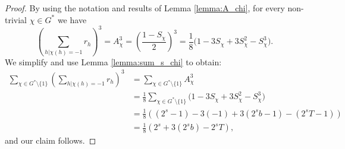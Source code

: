 \documentclass[12pt,twoside,]{amsart}
\theoremstyle{plain}
\theoremstyle{definition}
\begin{document}
\begin{proof}
By using the notation and results of Lemma \ref{lemma:A_chi}, for every 
non-trivial $\chi \in G^{\ast}$ we have
\[
\left(\sum_{h | \chi(h)=-1}r_h \right)^3
=
A_{\chi}^3 = \left(\frac{1-S_{\chi}}{2}\right)^3
= \frac{1}{8}\bigl(1 - 3S_{\chi} + 3S_{\chi}^2 - S_{\chi}^3\bigr).
\]
We simplify and use Lemma \ref{lemma:sum_s_chi} to obtain:
\begin{align*}
\sum_{\chi \in G^{\ast} \setminus \{1\}} 
\left(
\sum_{h | \chi(h)=-1}r_h
\right)^3
&= \sum_{\chi \in G^{\ast} \setminus \{1\}} A_{\chi}^3
\\
&= \frac{1}{8}\sum_{\chi \in G^{\ast} \setminus \{1\}}
   \bigl(1 - 3S_{\chi} + 3S_{\chi}^2 - S_{\chi}^3\bigr) 
\\
&=
\frac{1}{8}
\left(
(2^s-1)
-3(-1) + 3(2^sb-1) -(2^s T -1) 
\right)
\\
& = 
\frac{1}{8}
\left( 
2^{s} + 3(2^sb) - 2^sT
\right),
\end{align*}
and our claim follows. 
\end{proof}
 
\end{document}
